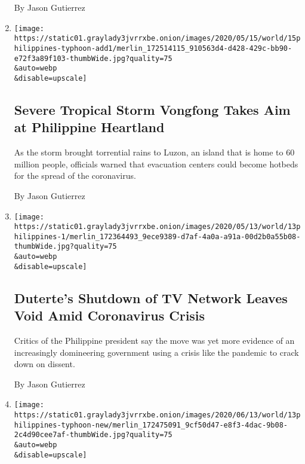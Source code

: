 \begin{enumerate}
  By Jason Gutierrez
\item
  \href{/2020/05/15/world/asia/typhoon-vongfong-philippines-luzon.html}{}

  \texttt{[image: https://static01.graylady3jvrrxbe.onion/images/2020/05/15/world/15philippines-typhoon-add1/merlin\_172514115\_910563d4-d428-429c-bb90-e72f3a89f103-thumbWide.jpg?quality=75\\\&auto=webp\\\&disable=upscale]}

  \hypertarget{severe-tropical-storm-vongfong-takes-aim-at-philippine-heartland}{%
  \subsection{Severe Tropical Storm Vongfong Takes Aim at Philippine
  Heartland}\label{severe-tropical-storm-vongfong-takes-aim-at-philippine-heartland}}

  As the storm brought torrential rains to Luzon, an island that is home
  to 60 million people, officials warned that evacuation centers could
  become hotbeds for the spread of the coronavirus.

  By Jason Gutierrez
\item
  \href{/2020/05/14/world/asia/duterte-philippines-tv-network-ABS-CBN.html}{}

  \texttt{[image: https://static01.graylady3jvrrxbe.onion/images/2020/05/13/world/13philippines-1/merlin\_172364493\_9ece9389-d7af-4a0a-a91a-00d2b0a55b08-thumbWide.jpg?quality=75\\\&auto=webp\\\&disable=upscale]}

  \hypertarget{dutertes-shutdown-of-tv-network-leaves-void-amid-coronavirus-crisis}{%
  \subsection{Duterte's Shutdown of TV Network Leaves Void Amid
  Coronavirus
  Crisis}\label{dutertes-shutdown-of-tv-network-leaves-void-amid-coronavirus-crisis}}

  Critics of the Philippine president say the move was yet more evidence
  of an increasingly domineering government using a crisis like the
  pandemic to crack down on dissent.

  By Jason Gutierrez
\item
  \href{/2020/05/13/world/asia/philippines-typhoon-vongfong.html}{}

  \texttt{[image: https://static01.graylady3jvrrxbe.onion/images/2020/06/13/world/13philippines-typhoon-new/merlin\_172475091\_9cf50d47-e8f3-4dac-9b08-2c4d90cee7af-thumbWide.jpg?quality=75\\\&auto=webp\\\&disable=upscale]}


\end{enumerate}
